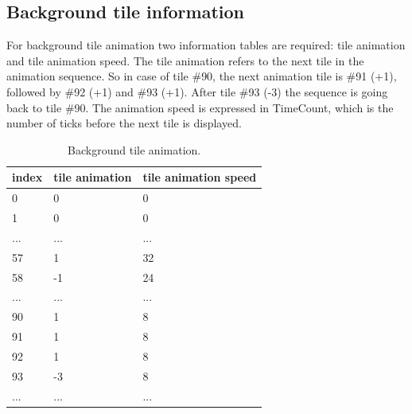 \documentclass[book.tex]{subfiles}
\begin{document}
\subsection{Background tile information}
For background tile animation two information tables are required: tile animation and tile animation speed. The tile animation refers to the next tile in the animation sequence. So in case of tile \#90, the next animation tile is \#91 (+1), followed by \#92 (+1) and \#93 (+1). After tile \#93 (-3) the sequence is going back to tile \#90. The animation speed is expressed in TimeCount, which is the number of ticks before the next tile is displayed. \\
 \begin{table}[H]
  \begin{tabularx}{\textwidth}[c]{XXX}
  \hline
  \textbf{index} & \textbf{tile animation} & \textbf{tile animation speed}   \\ \hline
  0             & 0          & 0    \\
  1             & 0          & 0    \\
  ...             & ...          & ...    \\
  57             & 1          & 32    \\
  58             & -1          & 24    \\
  ...             & ...          & ...    \\
  90             & 1          & 8    \\
  91            & 1          & 8    \\
  92             & 1          & 8    \\
  93             & -3          & 8    \\
  ...             & ...          & ...    \\
  \end{tabularx}
  \caption{Background tile animation.}
  \end{table}
\end{document}
